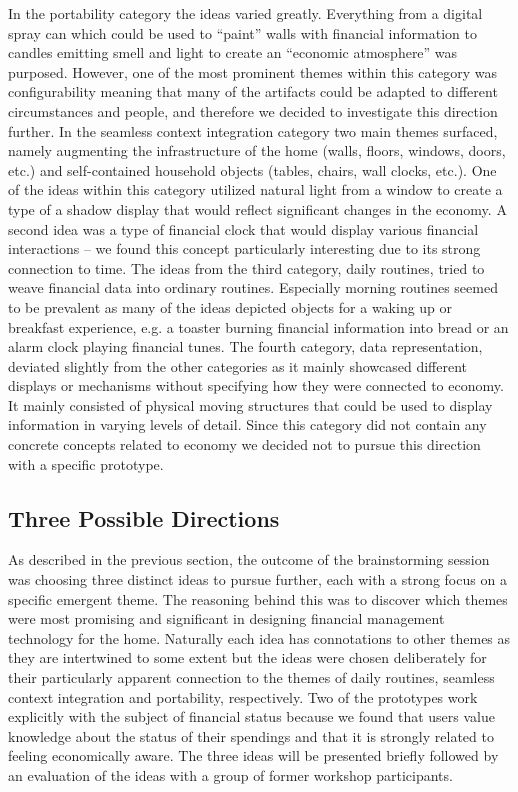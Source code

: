 In the portability category the ideas varied greatly. Everything from a digital spray can which could be used to “paint” walls with financial information to candles emitting smell and light to create an “economic atmosphere” was purposed. However, one of the most prominent themes within this category was configurability meaning that many of the artifacts could be adapted to different circumstances and people, and therefore we decided to investigate this direction further. In the seamless context integration category two main themes surfaced, namely augmenting the infrastructure of the home (walls, floors, windows, doors, etc.) and self-contained household objects (tables, chairs, wall clocks, etc.). One of the ideas within this category utilized natural light from a window to create a type of a shadow display that would reflect significant changes in the economy. A second idea was a type of financial clock that would display various financial interactions -- we found this concept particularly interesting due to its strong connection to time. The ideas from the third category, daily routines, tried to weave financial data into ordinary routines. Especially morning routines seemed to be prevalent as many of the ideas depicted objects for a waking up or breakfast experience, e.g. a toaster burning financial information into bread or an alarm clock playing financial tunes. The fourth category, data representation, deviated slightly from the other categories as it mainly showcased different displays or mechanisms without specifying how they were connected to economy. It mainly consisted of physical moving structures that could be used to display information in varying levels of detail. Since this category did not contain any concrete concepts related to economy we decided not to pursue this direction with a specific prototype.

\subsection{Three Possible Directions}
As described in the previous section, the outcome of the brainstorming session was choosing three distinct ideas to pursue further, each with a strong focus on a specific emergent theme. The reasoning behind this was to discover which themes were most promising and significant in designing financial management technology for the home. Naturally each idea has connotations to other themes as they are intertwined to some extent but the ideas were chosen deliberately for their particularly apparent connection to the themes of daily routines, seamless context integration and portability, respectively. Two of the prototypes work explicitly with the subject of financial status because we found that users value knowledge about the status of their spendings and that it is strongly related to feeling economically aware. The three ideas will be presented briefly followed by an evaluation of the ideas with a group of former workshop participants.

